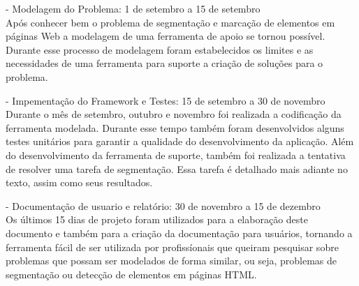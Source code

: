 \documentclass{acm_proc_article-sp}
\newcommand{\remove}[1]{}
\numberwithin{equation}{section}
\begin{document}
	- Modelagem do Problema: 1 de setembro a 15 de setembro \\ 
  Após conhecer bem o problema de segmentação e marcação de elementos em
  páginas Web a modelagem de uma ferramenta de apoio se tornou possível.
  Durante esse processo de modelagem foram estabelecidos os limites e as
  necessidades de uma ferramenta para suporte a criação de soluções para
  o problema.

	- Impementação do Framework e Testes: 15 de setembro a 30 de novembro \\
  Durante o mês de setembro, outubro e novembro foi realizada a
  codificação da ferramenta modelada. Durante esse tempo também foram
  desenvolvidos alguns testes unitários para garantir a qualidade do
  desenvolvimento da aplicação. Além do desenvolvimento da ferramenta de
  suporte, também foi realizada a tentativa de resolver uma tarefa de
  segmentação. Essa tarefa é detalhado mais adiante no texto, assim como
  seus resultados.

	- Documentação de usuario e relatório: 30 de novembro a 15 de dezembro \\
  Os últimos 15 dias de projeto foram utilizados para a elaboração deste
  documento e também para a criação da documentação para usuários,
  tornando a ferramenta fácil de ser utilizada por profissíonais que
  queiram pesquisar sobre problemas que possam ser modelados de forma
  similar, ou seja, problemas de segmentação ou detecção de elementos em
  páginas HTML.


\remove{
	- Para facilitar agilizar e promover uma fácil abordagem sobre tarefas
  de experimentação em páginas HTML é necessário um framework que
  possibilite: \\
		- parsear uma página HTML para uma árvore DOM: preprocessamento... \\
		- Criar um pipe onde módulos possam ser aplicados sobre a árvore DOM
    \\
		- fornecer uma interface onde os resultados dos módulos são
    guardados \\
		- Criar uma interface onde regras de avaliação sobre o resultado
    possam ser aplicadas \\
		- Criar forma de criar gabaritos para que as métricas de avaliação
    possam ser automatizadas \\
}
\end{document}

